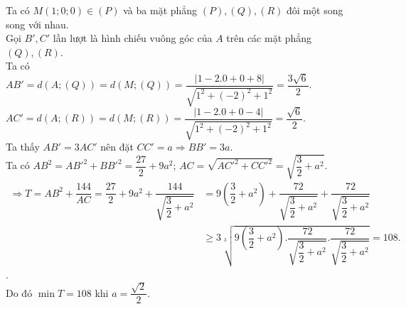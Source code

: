 \begin{ex}
{\begin{center}
		\end{center}
		Ta có $M(1;0;0)\in (P)$ và ba mặt phẳng $(P), (Q), (R)$ đôi một song song với nhau.\\
		Gọi $B', C'$ lần lượt là hình chiếu vuông góc của $A$ trên các mặt phẳng $(Q), (R)$.\\
		Ta có\\
		$AB'=d\left(A;(Q)\right)=d\left(M;(Q)\right)=\dfrac{|1-2.0+0+8|}{\sqrt{1^2+(-2)^2+1^2}}=\dfrac{3\sqrt{6}}{2}$.\\
		$AC'=d\left(A;(R)\right)=d\left(M;(R)\right)
		=\dfrac{|1-2.0+0-4|}{\sqrt{1^2+(-2)^2+1^2}}=\dfrac{\sqrt{6}}{2}$.\\
		Ta thấy $AB'=3AC'$ nên đặt $CC'=a\Rightarrow BB'=3a$.\\
		Ta có $AB^2=AB'^2+BB'^2=\dfrac{27}{2}+9a^2$; $AC=\sqrt{AC'^2+CC'^2}=\sqrt{\dfrac{3}{2}+a^2}$.\\
		$\begin{aligned} \Rightarrow 
		T=AB^2+\dfrac{144}{AC}=\dfrac{27}{2}+9a^2+\dfrac{144}{\sqrt{\dfrac{3}{2}+a^2}}
		&=9\left(\dfrac{3}{2}+a^2\right)+\dfrac{72}{\sqrt{\dfrac{3}{2}+a^2}}+\dfrac{72}{\sqrt{\dfrac{3}{2}+a^2}}\\
		&\geqslant 3\sqrt[3]{9\left(\dfrac{3}{2}+a^2\right).\dfrac{72}{\sqrt{\dfrac{3}{2}+a^2}}.\dfrac{72}{\sqrt{\dfrac{3}{2}+a^2}}}=108.
		\end{aligned}$.\\
		Do đó $\min T=108$ khi $a=\dfrac{\sqrt{2}}{2}$.
		
		
		
	}
\end{ex}

